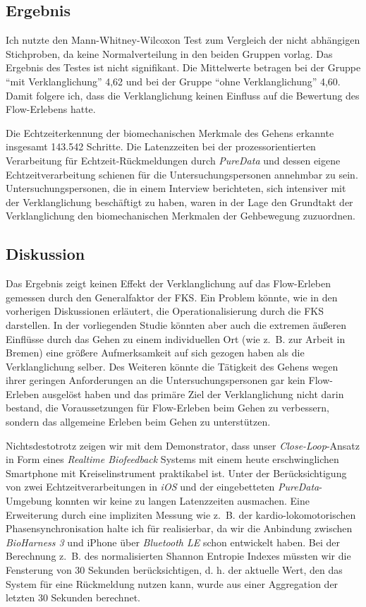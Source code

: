 \subsection{Ergebnis}
Ich nutzte den Mann-Whitney-Wilcoxon Test zum Vergleich der nicht abhängigen Stichproben, da keine Normalverteilung in den beiden Gruppen vorlag. Das Ergebnis des Testes ist nicht signifikant. Die Mittelwerte betragen bei der Gruppe "`mit Verklanglichung"' 4,62 und bei der Gruppe "`ohne Verklanglichung"' 4,60. Damit folgere ich, dass die Verklanglichung keinen Einfluss auf die Bewertung des Flow-Erlebens hatte. 

Die Echtzeiterkennung der biomechanischen Merkmale des Gehens erkannte insgesamt 143.542 Schritte. Die Latenzzeiten bei der prozessorientierten Verarbeitung für Echtzeit-Rückmeldungen durch \emph{PureData} und dessen eigene Echtzeitverarbeitung schienen für die Untersuchungspersonen annehmbar zu sein. Untersuchungspersonen, die in einem Interview berichteten, sich intensiver mit der Verklanglichung beschäftigt zu haben, waren in der Lage den Grundtakt der Verklanglichung den biomechanischen Merkmalen der Gehbewegung zuzuordnen.

\subsection{Diskussion} 
Das Ergebnis zeigt keinen Effekt der Verklanglichung auf das Flow-Erleben gemessen durch den Generalfaktor der \ac{FKS}. Ein Problem könnte, wie in den vorherigen Diskussionen erläutert, die Operationalisierung durch die \ac{FKS} darstellen. In der vorliegenden Studie könnten aber auch die extremen äußeren Einflüsse durch das Gehen zu einem individuellen Ort (wie z.~B. zur Arbeit in Bremen) eine größere Aufmerksamkeit auf sich gezogen haben als die Verklanglichung selber. Des Weiteren könnte die Tätigkeit des Gehens wegen ihrer geringen Anforderungen an die Untersuchungspersonen gar kein Flow-Erleben ausgelöst haben und das primäre Ziel der Verklanglichung nicht darin bestand, die Voraussetzungen für Flow-Erleben beim Gehen zu verbessern, sondern das allgemeine Erleben beim Gehen zu unterstützen. 

Nichtsdestotrotz zeigen wir mit dem Demonstrator, dass unser \emph{Close-Loop}-Ansatz in Form eines \emph{Realtime Biofeedback} Systems mit einem heute erschwinglichen Smartphone mit Kreiselinstrument praktikabel ist. Unter der Berücksichtigung von zwei Echtzeitverarbeitungen in \emph{iOS} und der eingebetteten \emph{PureData}-Umgebung konnten wir keine zu langen Latenzzeiten ausmachen. Eine Erweiterung durch eine impliziten Messung wie z.~B. der kardio-lokomotorischen Phasensynchronisation halte ich für realisierbar, da wir die Anbindung zwischen \emph{BioHarness 3} und iPhone über \emph{Bluetooth LE} schon entwickelt haben. Bei der Berechnung z.~B. des normalisierten Shannon Entropie Indexes müssten wir die Fensterung von 30 Sekunden berücksichtigen, d. h. der aktuelle Wert, den das System für eine Rückmeldung nutzen kann, wurde aus einer Aggregation der letzten 30 Sekunden berechnet. 

